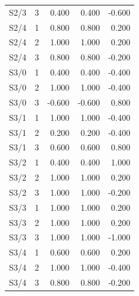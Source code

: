 \begin{longtable}{llrrr}
S2/3 & 3 & 0.400 & 0.400 & -0.600 \\
S2/4 & 1 & 0.800 & 0.800 & 0.200 \\
S2/4 & 2 & 1.000 & 1.000 & 0.200 \\
S2/4 & 3 & 0.800 & 0.800 & -0.200 \\
S3/0 & 1 & 0.400 & 0.400 & -0.400 \\
S3/0 & 2 & 1.000 & 1.000 & -0.400 \\
S3/0 & 3 & -0.600 & -0.600 & 0.800 \\
S3/1 & 1 & 1.000 & 1.000 & -0.400 \\
S3/1 & 2 & 0.200 & 0.200 & -0.400 \\
S3/1 & 3 & 0.600 & 0.600 & 0.800 \\
S3/2 & 1 & 0.400 & 0.400 & 1.000 \\
S3/2 & 2 & 1.000 & 1.000 & 0.200 \\
S3/2 & 3 & 1.000 & 1.000 & -0.200 \\
S3/3 & 1 & 1.000 & 1.000 & 0.200 \\
S3/3 & 2 & 1.000 & 1.000 & 0.200 \\
S3/3 & 3 & 1.000 & 1.000 & -1.000 \\
S3/4 & 1 & 0.600 & 0.600 & 0.200 \\
S3/4 & 2 & 1.000 & 1.000 & -0.400 \\
S3/4 & 3 & 0.800 & 0.800 & -0.200 \\
\end{longtable}
